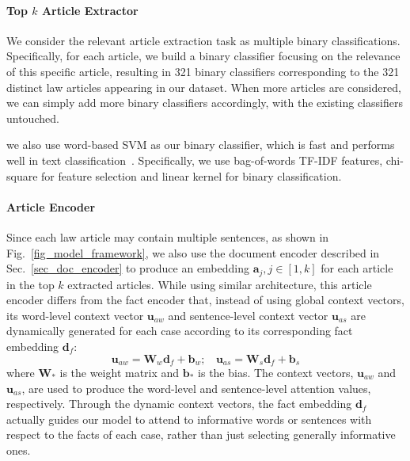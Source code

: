 \paragraph{Top $k$ Article Extractor}
\label{sec_article_extractor}
We consider the relevant article extraction task as multiple binary classifications. Specifically, for each article, we build a binary classifier focusing on the relevance of this specific article, resulting in 321 binary classifiers corresponding to the 321 distinct law articles 
appearing in our dataset.
When more articles are considered,
we can simply add more binary classifiers accordingly, with the existing classifiers untouched.

we also use word-based SVM as our binary classifier, which is fast and performs well in text classification~\cite{joachims2002learning,wang2012baselines}. Specifically, we use bag-of-words TF-IDF features, chi-square for feature selection and linear kernel for binary classification. 


\paragraph{Article Encoder}
\label{sec_article_encoder}
Since each law article may contain multiple sentences, 
as shown in Fig.~\ref{fig_model_framework}, we also use the document encoder described in Sec.~\ref{sec_doc_encoder} to produce an embedding $\mathbf{a}_j, j\in[1, k]$ for each article in the top $k$ extracted articles. 
While using similar architecture, this article encoder differs from the fact encoder that, instead of using global context vectors, its word-level context vector $\mathbf{u}_{aw}$ and sentence-level context vector $\mathbf{u}_{as}$ are dynamically generated  for each case according to its corresponding fact embedding $\mathbf{d}_f$:
\begin{equation}
\mathbf{u}_{aw} = \mathbf{W}_w \mathbf{d}_f + \mathbf{b}_w;\ \ \ \ \mathbf{u}_{as} = \mathbf{W}_s \mathbf{d}_f + \mathbf{b}_s
\label{eq_dynamic_context_vec}
\end{equation}
where $\mathbf{W_*}$ is the weight matrix and $\mathbf{b_*}$ is the bias. 
The context vectors, $\mathbf{u}_{aw}$ and $\mathbf{u}_{as}$, are used to produce the word-level and sentence-level attention values,  respectively.
Through the dynamic context vectors, the fact embedding $\mathbf{d}_f$ actually guides our model to attend to informative words or sentences with respect to the facts of each case, rather than just selecting generally informative ones.



